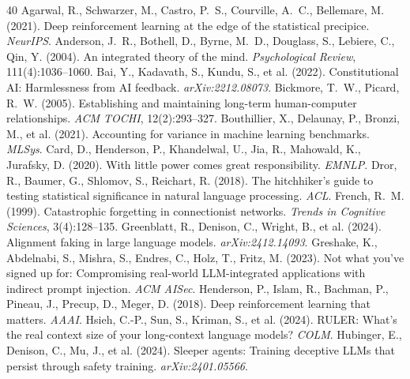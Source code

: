 \documentclass[11pt]{article}
\begin{document}
\begin{thebibliography}{40}
 Agarwal, R., Schwarzer, M., Castro, P.~S., Courville, A.~C., Bellemare, M. (2021). Deep reinforcement learning at the edge of the statistical precipice. \emph{NeurIPS}.
 Anderson, J.~R., Bothell, D., Byrne, M.~D., Douglass, S., Lebiere, C., Qin, Y. (2004). An integrated theory of the mind. \emph{Psychological Review}, 111(4):1036--1060.
 Bai, Y., Kadavath, S., Kundu, S., et al. (2022). Constitutional AI: Harmlessness from AI feedback. \emph{arXiv:2212.08073}.
 Bickmore, T.~W., Picard, R.~W. (2005). Establishing and maintaining long-term human-computer relationships. \emph{ACM TOCHI}, 12(2):293--327.
 Bouthillier, X., Delaunay, P., Bronzi, M., et al. (2021). Accounting for variance in machine learning benchmarks. \emph{MLSys}.
 Card, D., Henderson, P., Khandelwal, U., Jia, R., Mahowald, K., Jurafsky, D. (2020). With little power comes great responsibility. \emph{EMNLP}.
 Dror, R., Baumer, G., Shlomov, S., Reichart, R. (2018). The hitchhiker's guide to testing statistical significance in natural language processing. \emph{ACL}.
 French, R.~M. (1999). Catastrophic forgetting in connectionist networks. \emph{Trends in Cognitive Sciences}, 3(4):128--135.
 Greenblatt, R., Denison, C., Wright, B., et al. (2024). Alignment faking in large language models. \emph{arXiv:2412.14093}.
 Greshake, K., Abdelnabi, S., Mishra, S., Endres, C., Holz, T., Fritz, M. (2023). Not what you've signed up for: Compromising real-world LLM-integrated applications with indirect prompt injection. \emph{ACM AISec}.
 Henderson, P., Islam, R., Bachman, P., Pineau, J., Precup, D., Meger, D. (2018). Deep reinforcement learning that matters. \emph{AAAI}.
 Hsieh, C.-P., Sun, S., Kriman, S., et al. (2024). RULER: What's the real context size of your long-context language models? \emph{COLM}.
 Hubinger, E., Denison, C., Mu, J., et al. (2024). Sleeper agents: Training deceptive LLMs that persist through safety training. \emph{arXiv:2401.05566}.

\end{thebibliography}
\end{document}

